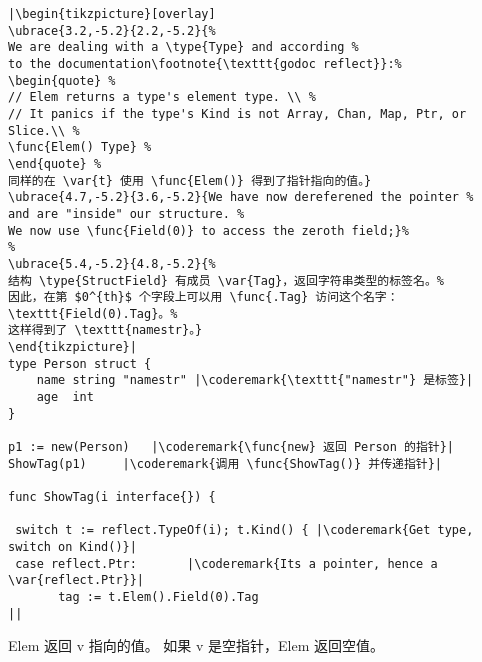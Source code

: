 \begin{lstlisting}[caption=使用反射自省,label=src:introspection]
|\begin{tikzpicture}[overlay]
\ubrace{3.2,-5.2}{2.2,-5.2}{%
We are dealing with a \type{Type} and according %
to the documentation\footnote{\texttt{godoc reflect}}:%
\begin{quote} %
// Elem returns a type's element type. \\ %
// It panics if the type's Kind is not Array, Chan, Map, Ptr, or Slice.\\ %
\func{Elem() Type} %
\end{quote} %
同样的在 \var{t} 使用 \func{Elem()} 得到了指针指向的值。}
\ubrace{4.7,-5.2}{3.6,-5.2}{We have now dereferened the pointer %
and are "inside" our structure. %
We now use \func{Field(0)} to access the zeroth field;}%
%
\ubrace{5.4,-5.2}{4.8,-5.2}{%
结构 \type{StructField} 有成员 \var{Tag}，返回字符串类型的标签名。%
因此，在第 $0^{th}$ 个字段上可以用 \func{.Tag} 访问这个名字：\texttt{Field(0).Tag}。%
这样得到了 \texttt{namestr}。}
\end{tikzpicture}|
type Person struct {
    name string "namestr" |\coderemark{\texttt{"namestr"} 是标签}|
    age  int
}

p1 := new(Person)   |\coderemark{\func{new} 返回 Person 的指针}|
ShowTag(p1)	    |\coderemark{调用 \func{ShowTag()} 并传递指针}|

func ShowTag(i interface{}) {

 switch t := reflect.TypeOf(i); t.Kind() { |\coderemark{Get type, switch on Kind()}|
 case reflect.Ptr:       |\coderemark{Its a pointer, hence a \var{reflect.Ptr}}|
       tag := t.Elem().Field(0).Tag
||
\end{lstlisting}
Elem 返回 v 指向的值。%
如果 v 是空指针，Elem 返回空值。%
